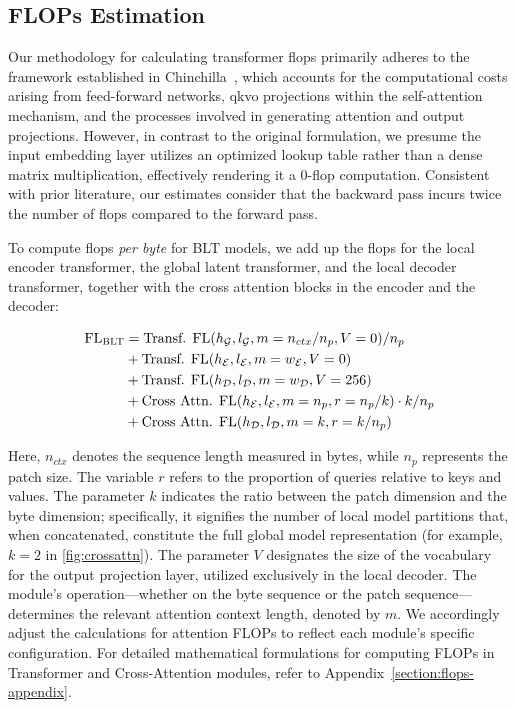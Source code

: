 \subsection{FLOPs Estimation} 
\label{section:flops}

Our methodology for calculating transformer flops primarily adheres to the framework established in Chinchilla~\citep{hoffmann2022training}, which accounts for the computational costs arising from feed-forward networks, qkvo projections within the self-attention mechanism, and the processes involved in generating attention and output projections. However, in contrast to the original formulation, we presume the input embedding layer utilizes an optimized lookup table rather than a dense matrix multiplication, effectively rendering it a 0-flop computation. Consistent with prior literature, our estimates consider that the backward pass incurs twice the number of flops compared to the forward pass.

To compute flops \textit{per byte} for {\textsc BLT} models, we add up the flops for the local encoder transformer, the global latent transformer, and the local decoder transformer, together with the cross attention blocks in the encoder and the decoder:

\begin{align}
    \text{FL}_{\text{{\textsc BLT}}} &= \text{Transf. FL}(h_{\mathcal{G}}, l_{\mathcal{G}}, m=n_{ctx}/n_p,V=0) / n_p\\
   &+ \text{Transf. FL}(h_{\mathcal{E}}, l_{\mathcal{E}}, m=w_{\mathcal{E}}, V=0) \\
   &+ \text{Transf. FL}(h_{\mathcal{D}}, l_{\mathcal{D}}, m=w_{\mathcal{D}}, V=256) \\ 
    &+ \text{Cross Attn. FL}(h_{\mathcal{E}}, l_{\mathcal{E}}, m=n_p, r=n_p/k) \cdot k/n_p \\ 
   &+ \text{Cross Attn. FL}(h_{\mathcal{D}}, l_{\mathcal{D}}, m=k, r=k/n_p) 
\end{align}

Here, $n_{ctx}$ denotes the sequence length measured in bytes, while $n_p$ represents the patch size. The variable $r$ refers to the proportion of queries relative to keys and values. The parameter $k$ indicates the ratio between the patch dimension and the byte dimension; specifically, it signifies the number of local model partitions that, when concatenated, constitute the full global model representation (for example, $k=2$ in \autoref{fig:crossattn}). The parameter $V$ designates the size of the vocabulary for the output projection layer, utilized exclusively in the local decoder. The module’s operation—whether on the byte sequence or the patch sequence—determines the relevant attention context length, denoted by $m$. We accordingly adjust the calculations for attention FLOPs to reflect each module’s specific configuration. For detailed mathematical formulations for computing FLOPs in Transformer and Cross-Attention modules, refer to Appendix~\ref{section:flops-appendix}.

